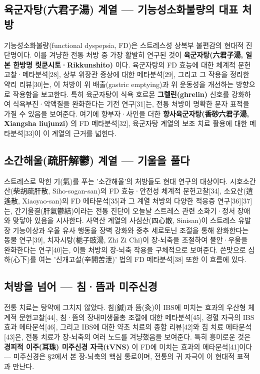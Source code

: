 \documentclass[11pt,oneside]{book}
\begin{document}
\subsection{육군자탕(六君子湯) 계열 — 기능성소화불량의 대표 처방}
기능성소화불량(functional dyspepsia, FD)은 스트레스성 상복부 불편감의 현대적 진단명이다. 이를 겨냥한 전통 처방 중 가장 활발히 연구된 것이 \textbf{육군자탕(六君子湯, 일본 한방명 릿쿤시토·Rikkunshito)} 이다. 육군자탕의 FD 효능에 대한 체계적 문헌고찰·메타분석[28], 상부 위장관 증상에 대한 메타분석[29], 그리고 그 작용을 정리한 약리 리뷰[30]는, 이 처방이 위 배출(gastric emptying)과 위 운동성을 개선하는 방향으로 작용함을 보고한다. 특히 육군자탕이 식욕 호르몬 \textbf{그렐린(ghrelin)} 신호를 강화하여 식욕부진·악액질을 완화한다는 기전 연구[31]는, 전통 처방이 명확한 분자 표적을 가질 수 있음을 보여준다. 여기에 향부자·사인을 더한 \textbf{향사육군자탕(香砂六君子湯, Xiangsha liujunzi)} 의 FD 메타분석[32], 육군자탕 계열의 보조 치료 활용에 대한 메타분석[33]이 이 계열의 근거를 넓힌다.

\subsection{소간해울(疏肝解鬱) 계열 — 기울을 풀다}
스트레스로 막힌 기(氣)를 푸는 '소간해울'의 처방들도 현대 연구의 대상이다. 시호소간산(柴胡疏肝散, Siho-sogan-san)의 FD 효능·안전성 체계적 문헌고찰[34], 소요산(逍遙散, Xiaoyao-san)의 FD 메타분석[35]과 그 계열 처방의 다양한 적응증 연구[36][37]는, 간기울결(肝氣鬱結)이라는 전통 진단이 오늘날 스트레스 관련 소화기·정서 장애와 맞닿아 있음을 시사한다. 사역산 계열의 사심산(四心散, Sinisan)이 스트레스 유발 장 기능이상과 우울 유사 행동을 장벽 강화와 중추 세로토닌 조절을 통해 완화한다는 동물 연구[39], 치자시탕(梔子豉湯, Zhi Zi Chi)이 장-뇌축을 조절하여 불안·우울을 완화한다는 연구[40]는, 이들 처방의 장-뇌축 작용을 구체적으로 보여준다. 쓴맛으로 심하(心下)를 여는 '신개고설(辛開苦泄)' 법의 FD 메타분석[38] 또한 이 흐름에 있다.

\subsection{처방을 넘어 — 침·뜸과 미주신경}
전통 치료는 탕약에 그치지 않았다. 침(鍼)과 뜸(灸)이 IBS에 미치는 효과의 우산형 체계적 문헌고찰[44], 침·뜸의 장내미생물총 조절에 대한 메타분석[45], 경혈 자극의 IBS 효과 메타분석[46], 그리고 IBS에 대한 약초 치료의 종합 리뷰[42]와 침 치료 메타분석[43]은, 전통 치료가 장-뇌축의 여러 노드를 겨냥했음을 보여준다. 특히 흥미로운 것은 \textbf{경피적 이주(耳珠) 미주신경 자극(tVNS)} 이 FD에 미치는 효과의 메타분석[41]이다 — 미주신경은 §2에서 본 장-뇌축의 핵심 통로이며, 전통의 귀 자극이 이 현대적 표적과 만난다.
\end{document}
